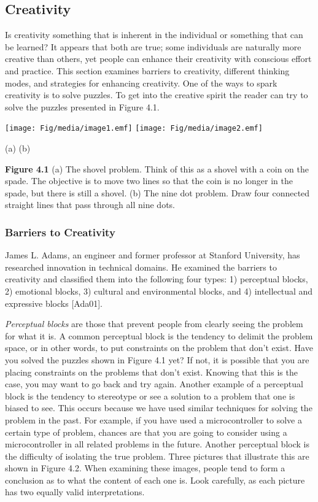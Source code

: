 \subsection{Creativity}\label{creativity}

Is creativity something that is inherent in the individual or something
that can be learned? It appears that both are true; some individuals are
naturally more creative than others, yet people can enhance their
creativity with conscious effort and practice. This section examines
barriers to creativity, different thinking modes, and strategies for
enhancing creativity. One of the ways to spark creativity is to solve
puzzles. To get into the creative spirit the reader can try to solve the
puzzles presented in Figure 4.1.

\texttt{[image: Fig/media/image1.emf]}
\texttt{[image: Fig/media/image2.emf]}

(a) (b)

\textbf{Figure 4.1} (a) The shovel problem. Think of this as a shovel
with a coin on the spade. The ob­jective is to move two lines so that the
coin is no longer in the spade, but there is still a shovel. (b) The
nine dot problem. Draw four connected straight lines that pass through
all nine dots.

\subsubsection{Barriers to Creativity}\label{barriers-to-creativity}

James L. Adams, an engineer and former professor at Stanford University,
has researched in­novation in technical domains. He examined the barriers
to creativity and classified them into the following four types: 1)
perceptual blocks, 2) emotional blocks, 3) cultural and environ­mental
blocks, and 4) intellectual and expressive blocks {[}Ada01{]}.

\emph{Perceptual blocks} are those that prevent people from clearly
seeing the problem for what it is. A common perceptual block is the
tendency to delimit the problem space, or in other words, to put
constraints on the problem that don't exist. Have you solved the puzzles
shown in Figure 4.1 yet? If not, it is possible that you are placing
constraints on the problems that don't exist. Knowing that this is the
case, you may want to go back and try again. Another example of a
perceptual block is the tendency to stereotype or see a solution to a
problem that one is biased to see. This occurs because we have used
similar techniques for solving the problem in the past. For example, if
you have used a microcontroller to solve a certain type of problem,
chances are that you are going to consider using a microcontroller in
all related problems in the future. Another perceptual block is the
difficulty of isolating the true problem. Three pictures that illustrate
this are shown in Figure 4.2. When examining these images, people tend
to form a conclusion as to what the content of each one is. Look
carefully, as each picture has two equally valid interpretations.

